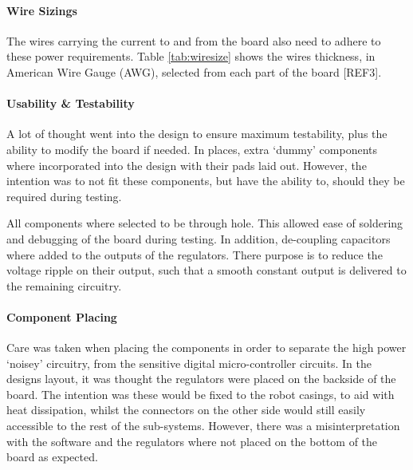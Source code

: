 \paragraph{Wire Sizings}
The wires carrying the current to and from the board also need to adhere to these power requirements. Table \ref{tab:wiresize} shows the wires thickness, in American Wire Gauge (AWG), selected from each part of the board [REF3].\par

\begin{table}[ht]
\caption{Wire Sizings Required for each Power Line}
\label{tab:wiresize}
\end{table}

\paragraph{Usability \& Testability}
A lot of thought went into the design to ensure maximum testability, plus the ability to modify the board if needed. In places, extra ‘dummy’ components where incorporated into the design with their pads laid out. However, the intention was to not fit these components, but have the ability to, should they be required during testing.\par

All components where selected to be through hole. This allowed ease of soldering and debugging of the board during testing. In addition, de-coupling capacitors where added to the outputs of the regulators. There purpose is to reduce the voltage ripple on their output, such that a smooth constant output is delivered to the remaining circuitry.\par

\paragraph{Component Placing}
Care was taken when placing the components in order to separate the high power ‘noisey’ circuitry, from the sensitive digital micro-controller circuits. In the designs layout, it was thought the regulators were placed on the backside of the board. The intention was these would be fixed to the robot casings, to aid with heat dissipation, whilst the connectors on the other side would still easily accessible to the rest of the sub-systems. However, there was a misinterpretation with the software and the regulators where not placed on the bottom of the board as expected.\par

